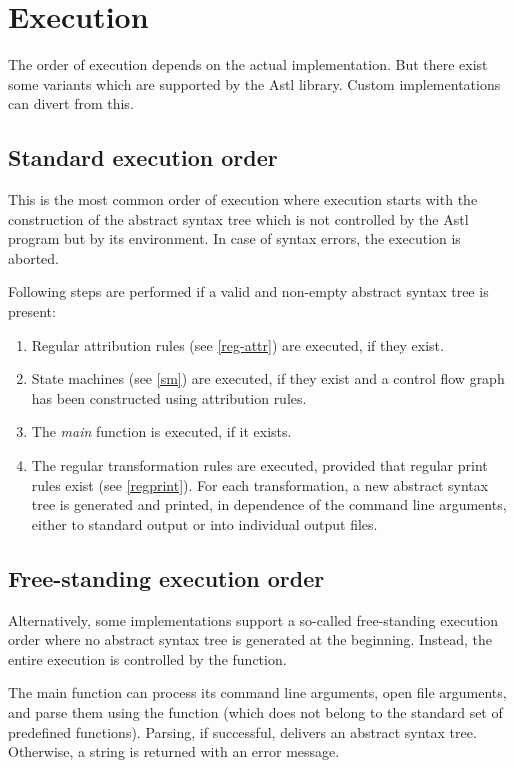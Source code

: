 \chapter{Execution}
The order of execution depends on the actual implementation. But
there exist some variants which are supported by the Astl library.
Custom implementations can divert from this.

\section{Standard execution order}\label{xorder}
This is the most common order of execution where
execution starts with the construction of the abstract syntax tree
which is not controlled by the Astl program but by its environment.
In case of syntax errors, the execution is aborted.

Following steps are performed if a valid and non-empty
abstract syntax tree is present:

\begin{enumerate}
   \item Regular attribution rules (see \ref{reg-attr}) are executed,
      if they exist.
   \item State machines (see \ref{sm}) are executed, if they exist
      and a control flow graph has been constructed using attribution rules.
   \item The \textit{main} function is executed, if it exists.
   \item The regular transformation rules are executed, provided
      that regular print rules exist (see \ref{regprint}).
      For each transformation, a new abstract syntax tree is generated
      and printed, in dependence of the command line arguments, either
      to standard output or into individual output files.
\end{enumerate}

\section{Free-standing execution order}\label{free-xorder}
Alternatively, some implementations support a so-called free-standing execution
order
where no abstract syntax tree is generated at the
beginning. Instead, the entire execution is controlled by the
 function.

The main function can process its command line arguments,
open file arguments, and parse them using the 
function (which does not belong to the standard set of predefined functions).
Parsing, if successful, delivers an abstract syntax tree. Otherwise,
a string is returned with an error message.

